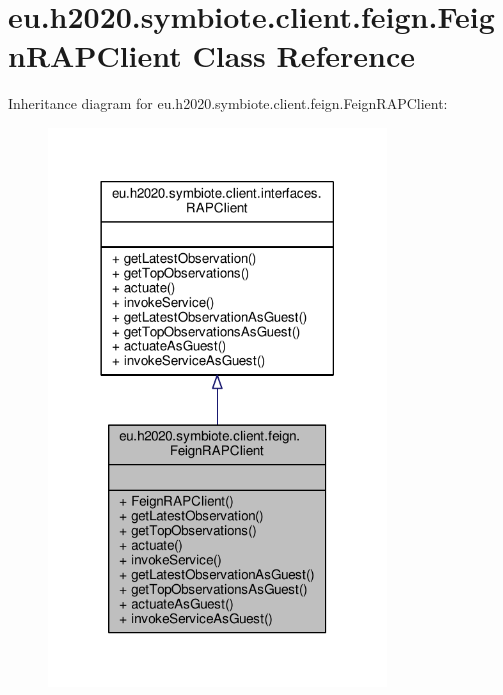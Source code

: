 \hypertarget{classeu_1_1h2020_1_1symbiote_1_1client_1_1feign_1_1FeignRAPClient}{}\section{eu.\+h2020.\+symbiote.\+client.\+feign.\+Feign\+R\+A\+P\+Client Class Reference}
\label{classeu_1_1h2020_1_1symbiote_1_1client_1_1feign_1_1FeignRAPClient}


Inheritance diagram for eu.\+h2020.\+symbiote.\+client.\+feign.\+Feign\+R\+A\+P\+Client\+:\nopagebreak
\begin{figure}[H]
\begin{center}
\leavevmode
\includegraphics[width=254pt]{classeu_1_1h2020_1_1symbiote_1_1client_1_1feign_1_1FeignRAPClient__inherit__graph}
\end{center}
\end{figure}


